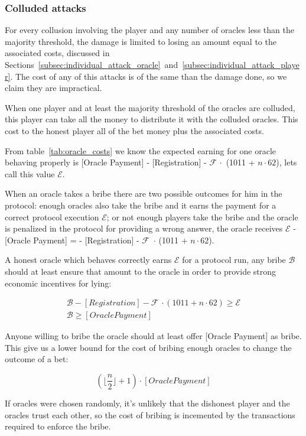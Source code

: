 \subsubsection{Colluded attacks}\label{subsec:colluded_attacks}

For every collusion involving the player and any number of oracles less than
  the majority threshold, the damage is limited to losing an amount equal to the
  associated costs, discussed in
  Sections~\ref{subsec:individual_attack_oracle}~and~\ref{subsec:individual_attack_player}.
The cost of any of this attacks is of the same than the damage done, so we claim
  they are impractical.

When one player and at least the majority threshold of the oracles are colluded,
  this player can take all the money to distribute it with the colluded oracles.
This cost to the honest player all of the bet money plus the associated costs.

From table~\ref{tab:oracle_costs} we know the expected earning for one oracle
  behaving properly is
  [Oracle Payment] - [Registration] - $\mathcal{F}\, \cdot$ (1011 + $n \cdot 62$),
  lets call this value $\mathcal{E}$.

When an oracle takes a bribe there are two possible outcomes for him in the
  protocol:
  enough oracles also take the bribe and it earns the payment for a correct
  protocol execution $\mathcal{E}$; or not enough
  players take the bribe and the oracle is penalized in the protocol for
  providing a wrong answer, the oracle receives
  $\mathcal{E}$ - [Oracle Payment] =
  - [Registration] - $\mathcal{F}$\, $\cdot$ (1011 + $n \cdot 62$).

A honest oracle which behaves correctly earns $\mathcal{E}$ for a protocol run,
  any bribe $\mathcal{B}$ should at least ensure that amount to the oracle in
  order to provide strong economic incentives for lying:

\begin{align}
  \mathcal{B} - [Registration] - \mathcal{F}\, \cdot (1011 + n \cdot 62) \geq \mathcal{E} \nonumber \\
  \mathcal{B} \geq [Oracle Payment]
\end{align}

Anyone willing to bribe the oracle should at least offer [Oracle Payment] as bribe.
This give us a lower bound for the cost of bribing enough oracles to change the
  outcome of a bet:

  \begin{equation}
   (\lfloor \frac{n}{2} \rfloor + 1) \cdot [Oracle Payment]
  \end{equation}

If oracles were chosen randomly, it's unlikely that the dishonest player and
  the oracles trust each other, so the cost of bribing is incemented by the
  transactions required to enforce the bribe.
